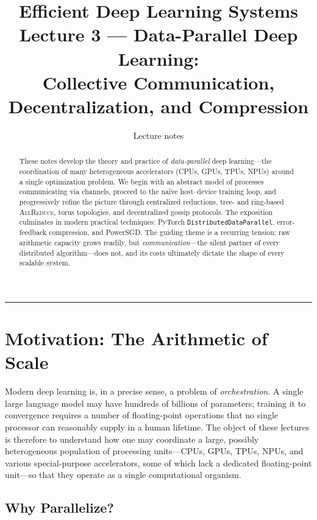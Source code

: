 \documentclass[11pt,a4paper]{article}
\title{\textbf{Efficient Deep Learning Systems} \\[0.3em]
       \large Lecture 3 --- Data-Parallel Deep Learning: \\
       Collective Communication, Decentralization, and Compression}
\author{Lecture notes}
\date{}
\theoremstyle{definition}
\theoremstyle{remark}
\theoremstyle{plain}
\newcommand{\allreduce}{\textsc{AllReduce}}
\begin{document}
\sloppy
\maketitle

\begin{abstract}
\noindent
These notes develop the theory and practice of \emph{data-parallel} deep
learning---the coordination of many heterogeneous accelerators (CPUs,
GPUs, TPUs, NPUs) around a single optimization problem. We begin with an
abstract model of processes communicating via channels, proceed to the
na\"ive host--device training loop, and progressively refine the picture
through centralized reductions, tree- and ring-based \allreduce, torus
topologies, and decentralized gossip protocols. The exposition culminates
in modern practical techniques: PyTorch \texttt{DistributedDataParallel},
error-feedback compression, and PowerSGD. The guiding theme is a
recurring tension: raw arithmetic capacity grows readily, but
\emph{communication}---the silent partner of every distributed
algorithm---does not, and its costs ultimately dictate the shape of every
scalable system.
\end{abstract}

\tableofcontents
\bigskip
\hrule
\bigskip

\section{Motivation: The Arithmetic of Scale}

Modern deep learning is, in a precise sense, a problem of
\emph{orchestration}. A single large language model may have hundreds of
billions of parameters; training it to convergence requires a number of
floating-point operations that no single processor can reasonably supply
in a human lifetime. The object of these lectures is therefore to
understand how one may coordinate a large, possibly heterogeneous
population of processing units---CPUs, GPUs, TPUs, NPUs, and various
special-purpose accelerators, some of which lack a dedicated
floating-point unit---so that they operate as a single computational
organism.

\subsection{Why Parallelize?}
\end{document}
